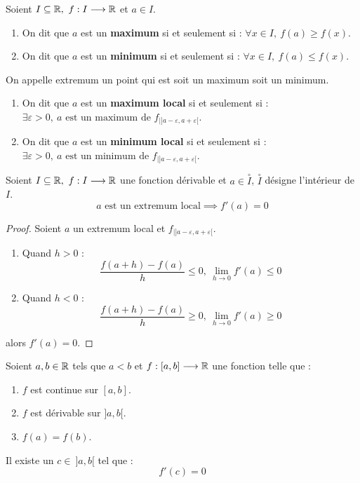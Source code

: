 \begin{definition}
    Soient $I \subseteq \mathbb{R},\ f : I \longrightarrow \mathbb{R}$ et $a \in I$.
    \begin{enumerate}
        \item On dit que $a$ est un \textbf{maximum} si et seulement si : $\forall x \in I,\ f(a) \geq f(x)$.
        \item On dit que $a$ est un \textbf{minimum} si et seulement si : $\forall x \in I,\ f(a) \leq f(x)$.
    \end{enumerate}
    On appelle extremum un point qui est soit un maximum soit un minimum.
    \begin{enumerate}
        \item On dit que $a$ est un \textbf{maximum local} si et seulement si : $\exists \varepsilon > 0,\ a \text{ est un maximum de } f_{|]a - \varepsilon, a + \varepsilon[}$.
        \item On dit que $a$ est un \textbf{minimum local} si et seulement si : $\exists \varepsilon > 0,\ a \text{ est un minimum de } f_{|]a - \varepsilon, a + \varepsilon[}$.
    \end{enumerate}
\end{definition}

\begin{theorem}
	Soient $I \subseteq \mathbb{R},\ f : I \longrightarrow \mathbb{R}$ une fonction dérivable et $a \in \overset{\circ}{I}$, $\overset{\circ}{I}$ désigne l'intérieur de $I$. 
	\[ a \text{ est un extremum local} \implies f'(a) = 0 \]
\end{theorem}

\begin{proof}
	Soient $a$ un extremum local et $f_{|]a - \varepsilon, a + \varepsilon[}$.
	\\
	\begin{enumerate}
		\item Quand $h > 0$ : 
		\[ \frac{f(a + h) - f(a)}{h} \leq 0,\ \lim_{h \to 0} f'(a) \leq 0 \]
		\item Quand $h < 0$ :
		\[ \frac{f(a + h) - f(a)}{h} \geq 0,\ \lim_{h \to 0} f'(a) \geq 0 \]
	\end{enumerate}
	alors $f'(a) = 0$.
\end{proof}

\begin{theorem}
    Soient $a, b \in \mathbb{R}$ tels que $a < b$ et $f : [a, b] \longrightarrow \mathbb{R}$ une fonction telle que :
    \begin{enumerate}
            \item $f$ est continue sur $[a, b]$.
            \item $f$ est dérivable sur $]a, b[$.
            \item $f(a) = f(b)$.
        \end{enumerate}
    \par \noindent Il existe un $c \in \ ]a, b[$ tel que : \[ f'(c) = 0 \]
\end{theorem}

